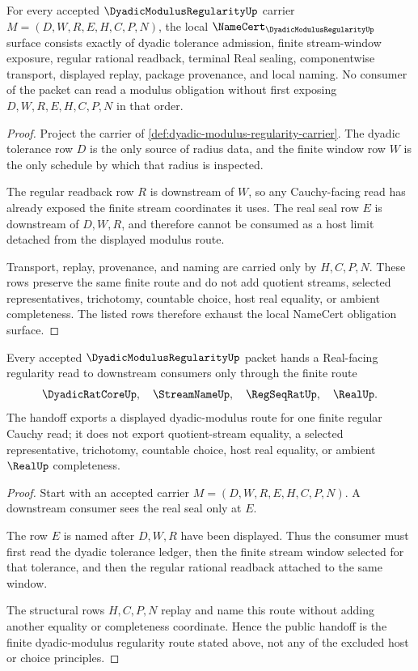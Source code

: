 \begin{theorem}
\label{thm:dyadic-modulus-regularity-namecert-obligations}
For every accepted $\DyadicModulusRegularityUp$ carrier $M=(D,W,R,E,H,C,P,N)$, the local $\NameCert_{\DyadicModulusRegularityUp}$ surface consists exactly of dyadic tolerance admission, finite stream-window exposure, regular rational readback, terminal Real sealing, componentwise transport, displayed replay, package provenance, and local naming. No consumer of the packet can read a modulus obligation without first exposing $D,W,R,E,H,C,P,N$ in that order.
\end{theorem}
\begin{proof}
Project the carrier of \autoref{def:dyadic-modulus-regularity-carrier}. The dyadic tolerance row $D$ is the only source of radius data, and the finite window row $W$ is the only schedule by which that radius is inspected.

The regular readback row $R$ is downstream of $W$, so any Cauchy-facing read has already exposed the finite stream coordinates it uses. The real seal row $E$ is downstream of $D,W,R$, and therefore cannot be consumed as a host limit detached from the displayed modulus route.

Transport, replay, provenance, and naming are carried only by $H,C,P,N$. These rows preserve the same finite route and do not add quotient streams, selected representatives, trichotomy, countable choice, host real equality, or ambient completeness. The listed rows therefore exhaust the local NameCert obligation surface.
\end{proof}

\begin{theorem}
\label{thm:dyadic-modulus-regularity-stream-handoff}
Every accepted $\DyadicModulusRegularityUp$ packet hands a Real-facing regularity read to downstream consumers only through the finite route
$$
\DyadicRatCoreUp,\quad
\StreamNameUp,\quad
\RegSeqRatUp,\quad
\RealUp .
$$
The handoff exports a displayed dyadic-modulus route for one finite regular Cauchy read; it does not export quotient-stream equality, a selected representative, trichotomy, countable choice, host real equality, or ambient $\RealUp$ completeness.
\end{theorem}
\begin{proof}
Start with an accepted carrier $M=(D,W,R,E,H,C,P,N)$. A downstream consumer sees the real seal only at $E$.

The row $E$ is named after $D,W,R$ have been displayed. Thus the consumer must first read the dyadic tolerance ledger, then the finite stream window selected for that tolerance, and then the regular rational readback attached to the same window.

The structural rows $H,C,P,N$ replay and name this route without adding another equality or completeness coordinate. Hence the public handoff is the finite dyadic-modulus regularity route stated above, not any of the excluded host or choice principles.
\end{proof}

